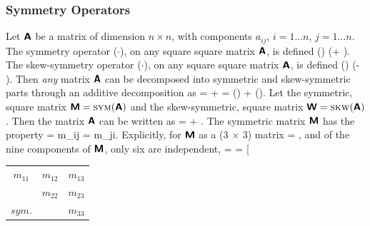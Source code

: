 \subsubsection{Symmetry Operators}
Let $\mbox{\sffamily\bfseries A}$ be a matrix of dimension $n \times n$, 
with components $a_{ij}$, 
$i=1\ldots n$, $j=1\ldots n$.  
The symmetry operator \sym($\cdot$), on any square square 
matrix $\mbox{\sffamily\bfseries A}$, is defined
\be
\mbox{\sym}(\tAbold)  \half (\tAbold + \tAbold\transpose).
\ee
The skew-symmetry operator \skw($\cdot$), on any square square 
matrix $\mbox{\sffamily\bfseries A}$, is defined
\be
\mbox{\skw}(\tAbold)  \half (\tAbold - \tAbold\transpose).
\ee
Then {\em any} matrix $\mbox{\sffamily\bfseries A}$ can be decomposed into symmetric and
skew-symmetric parts through an additive decomposition as
\be
\tAbold = \underset{\mbox{\sym}}{\underbrace{\dst\half\left(\tAbold 
+ \tAbold\transpose\right)}}
      \;\;  + \;\; \underset{\mbox{\skw}}{\underbrace{\dst\half\left(\tAbold 
- \tAbold\transpose\right)}} = 
\mbox{\sym}(\tAbold) \; + \mbox{\skw}(\tAbold).
\ee
Let the symmetric, square matrix $\mbox{\sffamily\bfseries M} = \mbox{{\sc sym}}(\mbox{\sffamily\bfseries A})$ and
the skew-symmetric, square matrix $\mbox{\sffamily\bfseries W} = \mbox{{\sc skw}}(\mbox{\sffamily\bfseries A})$.  Then
the matrix $\mbox{\sffamily\bfseries A}$ can be written as
\be
\tAbold = \tMbold + \tWbold.
\ee
The symmetric matrix $\mbox{\sffamily\bfseries M}$ has the property
\be
\tMbold = \tMbold\transpose 
\;\;\Longleftrightarrow\;\;
m_{ij} = m_{ji}.
\ee
Explicitly, for $\mbox{\sffamily\bfseries M}$ as a (3 $\times$ 3) matrix
\be
{}
= 
,
\ee
and of the nine components of $\mbox{\sffamily\bfseries M}$, only six are independent, 
\be
\tMbold = 
= 
\left[
    \begin{tabular}{ccc}
    $m_{11}$ & $m_{12}$ & $m_{13}$ \\
             & $m_{22}$ & $m_{23}$ \\
    $sym.$   &          & $m_{33}$
    \end{tabular}
